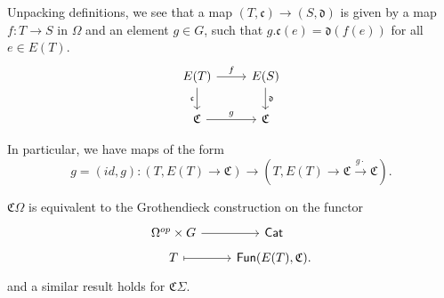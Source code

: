 \documentclass[a4paper,10pt
,draft
]{article}%
\begin{document}
\begin{remark}
      Unpacking definitions, we see that a map $(T, \mathfrak c) \to (S, \mathfrak d)$ is given by
      a map $f: T \to S$ in $\Omega$ and an element $g\in G$,
      such that $g.\mathfrak c(e) = \mathfrak d(f(e))$ for all $e \in E(T)$.
      \begin{equation}
            \begin{tikzcd}
                  E(T) \arrow[r, "f"] \arrow[d, "\mathfrak c"']
                  &
                  E(S) \arrow[d, "\mathfrak d"]
                  \\
                  \mathfrak C \arrow[r, "g"]
                  &
                  \mathfrak C
            \end{tikzcd}
      \end{equation}
      
      In particular, we have maps of the form
      \begin{equation}
            g = (id, g): (T, E(T) \to \mathfrak C) \to (T, E(T) \to \mathfrak C \xrightarrow{g \cdot} \mathfrak C). 
      \end{equation}
\end{remark}

\begin{remark}
      $\mathfrak C \Omega$ is equivalent to the
      Grothendieck construction on the functor
      \begin{equation}
            \begin{tikzcd}[row sep = tiny]
                  \Omega^{op} \times G \arrow[r]
                  &
                  \mathsf{Cat}
                  \\
                  T \arrow[r, mapsto]
                  &
                  \mathsf{Fun}(E(T), \mathfrak C).
            \end{tikzcd}
      \end{equation}
      and a similar result holds for $\mathfrak C \Sigma$. 
\end{remark}
\end{document}
